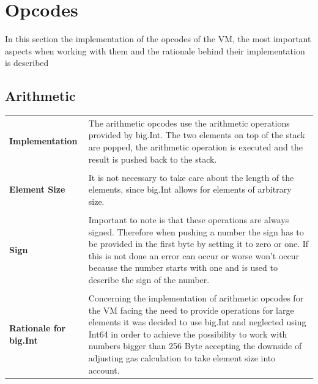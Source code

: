 \section{Opcodes}
In this section the implementation of the opcodes of the VM, the most important aspects when working with them and the rationale behind their implementation is described
\subsection{Arithmetic}
\label{arithmetic}
\begin{tabular}[t]{ p{3cm} p{12.5cm}}
\raggedright
\textbf{Implementation} & 
The arithmetic opcodes use the arithmetic operations provided by big.Int. The two elements on top of the stack are popped, the arithmetic operation is executed and the result is pushed back to the stack. \\ \\

\raggedright
\textbf{Element Size} & 
It is not necessary to take care about the length of the elements, since big.Int allows for elements of arbitrary size. \\ \\

\raggedright
\textbf{Sign} & 
Important to note is that these operations are always signed. Therefore when pushing a number the sign has to be provided in the first byte by setting it to zero or one. If this is not done an error can occur or worse won't occur because the number starts with one and is used to describe the sign of the number. \\ \\

\raggedright
\textbf{Rationale for big.Int} & 
Concerning the implementation of arithmetic opcodes for the VM
facing the need to provide operations for large elements it was decided to use big.Int and neglected using Int64 in order to achieve the possibility to work with numbers bigger than 256 Byte accepting the downside of adjusting gas calculation to take element size into account. \\
\end{tabular}
